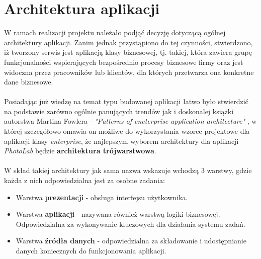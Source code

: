 \section{Architektura aplikacji}
\quad W ramach realizacji projektu należało podjąć decyzję dotyczącą ogólnej architektury aplikacji. Zanim jednak przystąpiono do tej czynności, stwierdzono, iż tworzony serwis jest aplikacją klasy biznesowej, tj. takiej, która zawiera grupę funkcjonalności wspierających bezpośrednio procesy biznesowe firmy oraz jest widoczna przez pracowników lub klientów, dla których przetwarza ona konkretne dane biznesowe. \cite{patterns-of-architecture} \\
\\
Posiadając już wiedzę na temat typu budowanej aplikacji łatwo było stwierdzić na podstawie zarówno ogólnie panujących trendów jak i doskonalej książki autorstwa Martina Fowlera - \textit{"Patterns of eneterprise application architecture"} \cite{patterns-of-architecture}, w której szczegółowo omawia on możliwe do wykorzystania wzorce projektowe dla aplikacji klasy \textit{enterprise}, że najlepszym wyborem architektury dla aplikacji \textit{PhotoLab} będzie \textbf{architektura trójwarstwowa}. \\
\\
W skład takiej architektury jak sama nazwa wskazuje wchodzą 3 warstwy, gdzie każda z nich odpowiedzialna jest za osobne zadania:
\begin{itemize}
    \item Warstwa \textbf{prezentacji} - obsługa interfejsu użytkownika.
    \item Warstwa \textbf{aplikacji} - nazywana również warstwą logiki biznesowej. Odpowiedzialna za wykonywanie kluczowych dla działania systemu zadań.
    \item Warstwa \textbf{źródła danych} - odpowiedzialna za składowanie i udostępnianie danych koniecznych do funkcjonowania aplikacji.
\end{itemize}
